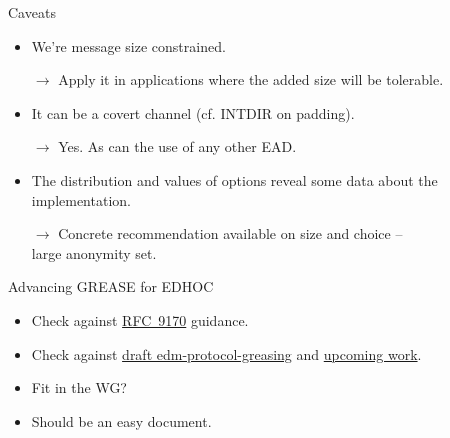 \documentclass[aspectratio=169,colorlinks]{beamer}
\newcommand{\rfc}[1]{\href{https://datatracker.ietf.org/doc/html/rfc#1}{RFC~#1}}
\newcommand{\ietfdraft}[1]{\href{https://datatracker.ietf.org/doc/draft-#1/}{draft #1}}
\begin{document}
\begin{frame}{Caveats}\Large
  \begin{itemize}
    \item We're message size constrained.

      $\to$ Apply it in applications where the added size will be tolerable.

    \item It can be a covert channel (cf. INTDIR on padding).

      $\to$ Yes. As can the use of any other EAD.

    \item The distribution and values of options reveal some data about the implementation.

      $\to$ Concrete recommendation available on size and choice -- \\large anonymity set.
  \end{itemize}
\end{frame}

\begin{frame}{Advancing GREASE for EDHOC}\Large
  \begin{itemize}
    \item Check against \rfc{9170} guidance.
    \item Check against \ietfdraft{edm-protocol-greasing} and \href{https://datatracker.ietf.org/meeting/118/session/edm}{upcoming work}.
    \item Fit in the WG?
    \item Should be an easy document.
  \end{itemize}
\end{frame}
\end{document}
